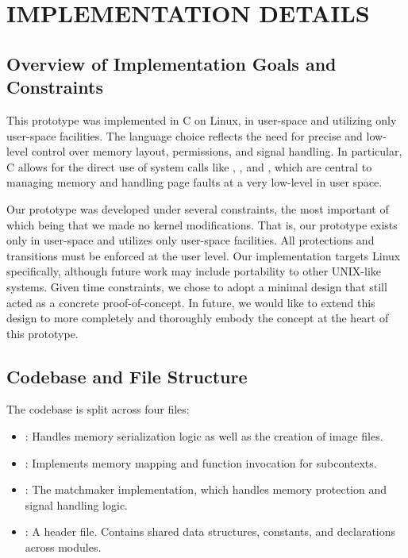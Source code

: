 \chapter*{IMPLEMENTATION DETAILS}
\thispagestyle{fancy}

\section*{Overview of Implementation Goals and Constraints}
This prototype was implemented in C on Linux, in user-space and utilizing only user-space facilities. The language choice reflects the need for precise and low-level control over memory layout, permissions, and signal handling. In particular, C allows for the direct use of system calls like , , and , which are central to managing memory and handling page faults at a very low-level in user space.

Our prototype was developed under several constraints, the most important of which being that we made no kernel modifications. That is, our prototype exists only in user-space and utilizes only user-space facilities. All protections and transitions must be enforced at the user level. Our implementation targets Linux specifically, although future work may include portability to other UNIX-like systems. Given time constraints, we chose to adopt a minimal design that still acted as a concrete proof-of-concept. In future, we would like to extend this design to more completely and thoroughly embody the concept at the heart of this prototype.

\newpage
\section*{Codebase and File Structure}
The codebase is split across four files:
\begin{itemize}
    \item {}: Handles memory serialization logic as well as the creation of image files.
    \item {}: Implements memory mapping and function invocation for subcontexts.
    \item {}: The matchmaker implementation, which handles memory protection and signal handling logic.
    \item {}: A header file. Contains shared data structures, constants, and declarations across modules.
\end{itemize}

